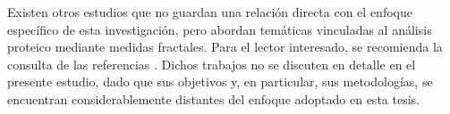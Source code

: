 Existen otros estudios que no guardan una relaci\'{o}n directa con el enfoque espec\'{i}fico de esta investigaci\'{o}n, pero abordan tem\'{a}ticas vinculadas al an\'{a}lisis proteico mediante medidas fractales. Para el lector interesado, se recomienda la consulta de las referencias \cite{Shen2001, Banerji2013, Sendker2024}. Dichos trabajos no se discuten en detalle en el presente estudio, dado que sus objetivos y, en particular, sus metodolog\'{i}as, se encuentran considerablemente distantes del enfoque adoptado en esta tesis.

\color{black}












